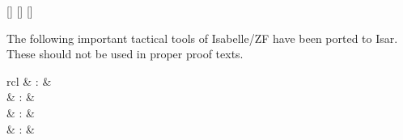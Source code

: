\begin{isabellebody}
\begin{isamarkuptext}
  \begin{railoutput}
[]
\rail@plus
\rail@bar
{}
[]
\rail@endbar
{}[]
\rail@endplus
\rail@end
\end{railoutput}%
\end{isamarkuptext}%
\isamarkuptrue%
%
\isamarkuptrue%
%
\begin{isamarkuptext}%
The following important tactical tools of Isabelle/ZF have been
  ported to Isar.  These should not be used in proper proof texts.

  \begin{matharray}{rcl}
    \hypertarget{method.ZF.case-tac}{\hyperlink{method.ZF.case-tac}{\mbox{}}} & : &  \\
    \hypertarget{method.ZF.induct-tac}{\hyperlink{method.ZF.induct-tac}{\mbox{}}} & : &  \\
    \hypertarget{method.ZF.ind-cases}{\hyperlink{method.ZF.ind-cases}{\mbox{}}} & : &  \\
    \hypertarget{command.ZF.inductive-cases}{\hyperlink{command.ZF.inductive-cases}{\mbox{}}} & : &  \\
  \end{matharray}


\end{isamarkuptext}
\end{isabellebody}
